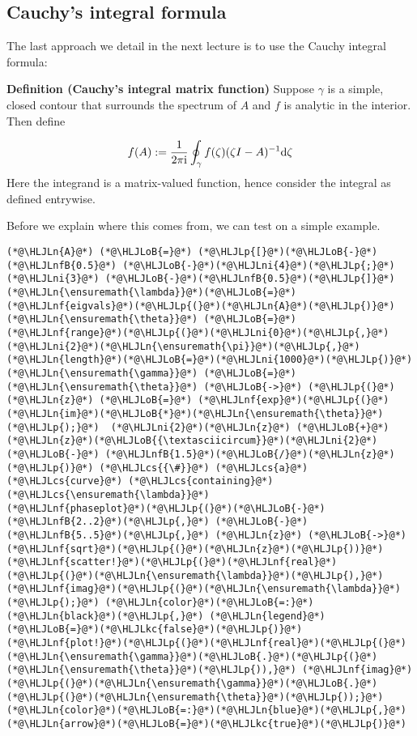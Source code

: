 \documentclass[12pt,a4paper]{article}
\newcommand{\HLJLkc}[1]{\textcolor[RGB]{59,151,46}{\textit{#1}}}
\newcommand{\HLJLn}[1]{#1}
\newcommand{\HLJLnf}[1]{\textcolor[RGB]{66,102,213}{#1}}
\newcommand{\HLJLnfB}[1]{\textcolor[RGB]{59,151,46}{#1}}
\newcommand{\HLJLni}[1]{\textcolor[RGB]{59,151,46}{#1}}
\newcommand{\HLJLoB}[1]{\textcolor[RGB]{102,102,102}{\textbf{#1}}}
\newcommand{\HLJLp}[1]{#1}
\newcommand{\HLJLcs}[1]{\textcolor[RGB]{153,153,119}{\textit{#1}}}
\def\D{ {\rm d} }
\def\I{ {\rm i} }
\begin{document}
\subsection{Cauchy's integral formula}
The last approach we detail in the next lecture is to use the Cauchy integral formula:

\textbf{Definition (Cauchy's integral  matrix function)} Suppose $\gamma$ is a simple, closed contour that surrounds the spectrum of $A$ and $f$ is analytic in the interior. Then define

\[
f(A) := {1 \over 2 \pi \I} \oint_\gamma f(\zeta)(\zeta I - A)^{-1} \D \zeta
\]
Here the integrand is a matrix-valued function, hence consider the integral as defined entrywise.

Before we explain where this comes from, we can test on a simple example.


\begin{lstlisting}
(*@\HLJLn{A}@*) (*@\HLJLoB{=}@*) (*@\HLJLp{[}@*)(*@\HLJLoB{-}@*)(*@\HLJLnfB{0.5}@*) (*@\HLJLoB{-}@*)(*@\HLJLni{4}@*)(*@\HLJLp{;}@*) (*@\HLJLni{3}@*) (*@\HLJLoB{-}@*)(*@\HLJLnfB{0.5}@*)(*@\HLJLp{]}@*)
(*@\HLJLn{\ensuremath{\lambda}}@*)(*@\HLJLoB{=}@*) (*@\HLJLnf{eigvals}@*)(*@\HLJLp{(}@*)(*@\HLJLn{A}@*)(*@\HLJLp{)}@*)
(*@\HLJLn{\ensuremath{\theta}}@*) (*@\HLJLoB{=}@*) (*@\HLJLnf{range}@*)(*@\HLJLp{(}@*)(*@\HLJLni{0}@*)(*@\HLJLp{,}@*)(*@\HLJLni{2}@*)(*@\HLJLn{\ensuremath{\pi}}@*)(*@\HLJLp{,}@*)(*@\HLJLn{length}@*)(*@\HLJLoB{=}@*)(*@\HLJLni{1000}@*)(*@\HLJLp{)}@*)
(*@\HLJLn{\ensuremath{\gamma}}@*) (*@\HLJLoB{=}@*) (*@\HLJLn{\ensuremath{\theta}}@*) (*@\HLJLoB{->}@*) (*@\HLJLp{(}@*)(*@\HLJLn{z}@*) (*@\HLJLoB{=}@*) (*@\HLJLnf{exp}@*)(*@\HLJLp{(}@*)(*@\HLJLn{im}@*)(*@\HLJLoB{*}@*)(*@\HLJLn{\ensuremath{\theta}}@*)(*@\HLJLp{);}@*)  (*@\HLJLni{2}@*)(*@\HLJLn{z}@*) (*@\HLJLoB{+}@*) (*@\HLJLn{z}@*)(*@\HLJLoB{{\textasciicircum}}@*)(*@\HLJLni{2}@*) (*@\HLJLoB{-}@*) (*@\HLJLnfB{1.5}@*)(*@\HLJLoB{/}@*)(*@\HLJLn{z}@*)(*@\HLJLp{)}@*) (*@\HLJLcs{{\#}}@*) (*@\HLJLcs{a}@*) (*@\HLJLcs{curve}@*) (*@\HLJLcs{containing}@*) (*@\HLJLcs{\ensuremath{\lambda}}@*)
(*@\HLJLnf{phaseplot}@*)(*@\HLJLp{(}@*)(*@\HLJLoB{-}@*)(*@\HLJLnfB{2..2}@*)(*@\HLJLp{,}@*) (*@\HLJLoB{-}@*)(*@\HLJLnfB{5..5}@*)(*@\HLJLp{,}@*) (*@\HLJLn{z}@*) (*@\HLJLoB{->}@*) (*@\HLJLnf{sqrt}@*)(*@\HLJLp{(}@*)(*@\HLJLn{z}@*)(*@\HLJLp{))}@*)
(*@\HLJLnf{scatter!}@*)(*@\HLJLp{(}@*)(*@\HLJLnf{real}@*)(*@\HLJLp{(}@*)(*@\HLJLn{\ensuremath{\lambda}}@*)(*@\HLJLp{),}@*)(*@\HLJLnf{imag}@*)(*@\HLJLp{(}@*)(*@\HLJLn{\ensuremath{\lambda}}@*)(*@\HLJLp{);}@*) (*@\HLJLn{color}@*)(*@\HLJLoB{=:}@*)(*@\HLJLn{black}@*)(*@\HLJLp{,}@*) (*@\HLJLn{legend}@*)(*@\HLJLoB{=}@*)(*@\HLJLkc{false}@*)(*@\HLJLp{)}@*)
(*@\HLJLnf{plot!}@*)(*@\HLJLp{(}@*)(*@\HLJLnf{real}@*)(*@\HLJLp{(}@*)(*@\HLJLn{\ensuremath{\gamma}}@*)(*@\HLJLoB{.}@*)(*@\HLJLp{(}@*)(*@\HLJLn{\ensuremath{\theta}}@*)(*@\HLJLp{)),}@*) (*@\HLJLnf{imag}@*)(*@\HLJLp{(}@*)(*@\HLJLn{\ensuremath{\gamma}}@*)(*@\HLJLoB{.}@*)(*@\HLJLp{(}@*)(*@\HLJLn{\ensuremath{\theta}}@*)(*@\HLJLp{));}@*) (*@\HLJLn{color}@*)(*@\HLJLoB{=:}@*)(*@\HLJLn{blue}@*)(*@\HLJLp{,}@*) (*@\HLJLn{arrow}@*)(*@\HLJLoB{=}@*)(*@\HLJLkc{true}@*)(*@\HLJLp{)}@*)
\end{lstlisting}
\end{document}
